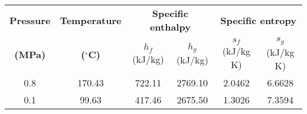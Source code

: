 \begin{table}[h!]
\centering
\begin{tabular}{|c|c|cc|cc|}
\hline
\textbf{Pressure} & \textbf{Temperature} & \multicolumn{2}{c|}{\textbf{Specific enthalpy}} & \multicolumn{2}{c|}{\textbf{Specific entropy}} \\ \cline{3-6}
\textbf{(MPa)} & \textbf{($^\circ$C)} & $h_f$ (kJ/kg) & $h_g$ (kJ/kg) & $s_f$ (kJ/kg K) & $s_g$ (kJ/kg K) \\ \hline
0.8 & 170.43 & 722.11 & 2769.10 & 2.0462 & 6.6628 \\ \hline
0.1 & 99.63 & 417.46 & 2675.50 & 1.3026 & 7.3594 \\ \hline
\end{tabular}
\end{table}
